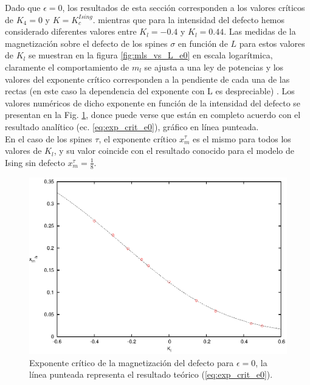 Dado que $\epsilon=0$, los resultados de esta secci\'on corresponden a los valores cr\'iticos de $K_{4}=0$ y $K=K_{c}^{Ising}$.
 mientras que para la intensidad del defecto hemos considerado diferentes valores entre $K_{l}=-0.4$ y $K_{l}=0.44$.
 Las medidas de la magnetizaci\'on sobre el defecto
 de los spines $\sigma$ en función de $L$ para estos valores de $K_{l}$ se muestran en la figura \ref{fig:mls_vs_L_e0} en escala logar\'itmica,
 claramente el comportamiento de $m_{l}$ se ajusta a una ley de potencias y los valores del exponente cr\'itico corresponden a la pendiente
 de cada una de las rectas (en este caso la dependencia del exponente con L es despreciable) . Los valores num\'ericos de dicho exponente en funci\'on de la intensidad del defecto se presentan en la Fig.
 \ref{fig:fit_arctan_e0}, donce puede verse que est\'an en completo acuerdo con el resultado anal\'itico (ec. \ref{eq:exp_crit_e0}),
 gr\'afico en l\'inea punteada.\\
En el caso de los spines $\tau$, el exponente cr\'itico $x_{m}^{\tau}$ es el mismo para todos los valores de $K_{l}$, y su valor coincide con el resultado
 conocido para el modelo de Ising sin defecto $x_{m}^{\tau}=\frac{1}{8}$.\\  

\begin{figure}[h!]
\begin{center}
\includegraphics[width=\figwidth]{graf/exp/fit_arctan_e0.eps}
\end{center}
\caption{Exponente crítico de la magnetización del defecto para $\epsilon=0$, la línea punteada representa el resultado teórico (\ref{eq:exp_crit_e0}).}
\label{fig:fit_arctan_e0}
\end{figure}


